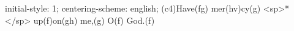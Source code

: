 initial-style: 1;
centering-scheme: english;
(c4)Have(fg) mer(hv)cy(g) <sp>*</sp> up(f)on(gh) me,(g) O(f) God.(f)
